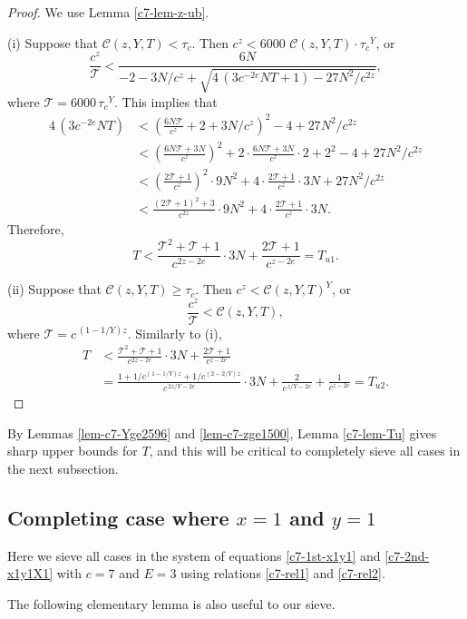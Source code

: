 \documentclass[11pt]{amsart}
\numberwithin{equation}{section}
\begin{document}
\begin{proof}
We use Lemma \ref{c7-lem-z-ub}. \par
%
(i) Suppose that ${\mathcal C}(z,Y,T)<\tau_c$.
Then $c^z < 6000\,\,{\mathcal C}(z,Y,T) \cdot {\tau_c}^Y$, or
\[
\frac{c^z}{\mathcal T} < \frac{6N}{-2-3N/c^z+\sqrt{4\,(3c^{-2e}N T+1)-27{N}^2/c^{2z}}},
\]
where $\mathcal T=6000\,{\tau_c}^Y$.
This implies that
\begin{align*}
4\,(3c^{-2e}N T)
&< \left(\frac{6 N \mathcal T}{c^z }
+2+3N/c^z\right)^2-4+27 N^2 / c^{2z}
\\
&<\left(\frac{6 N \mathcal T+3N}{c^z }
\right)^2
+
2 \cdot \frac{6 N \mathcal T+3N}{c^z }
\cdot 2
+2^2-4+27 N^2 / c^{2z}\\
&<\left(\frac{2 \mathcal T+1}{c^z }
\right)^2 \cdot 9 N^2
+
4 \cdot \frac{2 \mathcal T+1}{c^z }
\cdot 3N +27 N^2 / c^{2z}\\
&<
\frac{(2 \mathcal T+1)^2+3}{c^{2z}} \cdot 9 N^2
+
4 \cdot \frac{2 \mathcal T+1}{c^z }
\cdot 3N.
\end{align*}
Therefore,
\[
T
<\frac{\mathcal T^2+\mathcal T+1}{c^{2z-2e}} \cdot 3 N
+
\frac{2\mathcal T+1}{c^{z-2e} }=T_{u1}.
\]
\par
%
(ii) Suppose that ${\mathcal C}(z,Y,T) \ge \tau_c$.
Then $c^z < {\mathcal C}(z,Y,T)^ Y$, or
\[
\frac{c^z}{\mathcal T} < {\mathcal C}(z,Y,T),
\]
where $\mathcal T=c^{\,(1-1/Y)z}$.
Similarly to (i), %
\begin{align*}
T&<\frac{\mathcal T^2+\mathcal T+1}{c^{2z-2e}} \cdot 3 N +
\frac{2\mathcal T+1}{c^{z-2e} }\\
&=\frac{1+1/c^{(1-1/Y)z}+1/c^{(2-2/Y)z}}{c^{\,2z/Y-2e}} \cdot 3N
+
\frac{2}{c^{\,z/Y-2e} } + \frac{1}{c^{z-2e} }=T_{u2}.
\end{align*}
\end{proof}

By Lemmas \ref{lem-c7-Yge2596} and \ref{lem-c7-zge1500}, Lemma \ref{c7-lem-Tu} gives sharp upper bounds for $T$, and this will be critical to completely sieve all cases in the next subsection.

\subsection{Completing case where $x=1$ and $y=1$} 
\label{sec-7.4}
%
Here we sieve all cases in the system of equations \eqref{c7-1st-x1y1} and \eqref{c7-2nd-x1y1X1} with $c=7$ and $E=3$ using relations \eqref{c7-rel1} and \eqref{c7-rel2}.

The following elementary lemma is also useful to our sieve.
\end{document}
